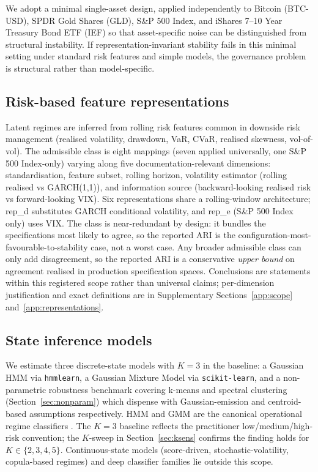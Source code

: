 \documentclass[preprint,12pt,authoryear]{elsarticle}
\newcommand{\BTC}{Bitcoin (BTC-USD)}
\newcommand{\GLD}{SPDR Gold Shares (GLD)}
\newcommand{\SPX}{S\&P 500 Index}
\newcommand{\IEF}{iShares 7--10 Year Treasury Bond ETF (IEF)}
\begin{document}
We adopt a minimal single-asset design, applied independently to \BTC{}, \GLD{}, \SPX{}, and \IEF{} so that asset-specific noise can be distinguished from structural instability. If representation-invariant stability fails in this minimal setting under standard risk features and simple models, the governance problem is structural rather than model-specific.

\subsection{Risk-based feature representations}

Latent regimes are inferred from rolling risk features common in downside risk management (realised volatility, drawdown, VaR, CVaR, realised skewness, vol-of-vol). The admissible class is eight mappings (seven applied universally, one \SPX{}-only) varying along five documentation-relevant dimensions: standardisation, feature subset, rolling horizon, volatility estimator (rolling realised vs GARCH(1,1)), and information source (backward-looking realised risk vs forward-looking VIX). Six representations share a rolling-window architecture; rep\_d substitutes GARCH conditional volatility, and rep\_e (\SPX{} only) uses VIX. The class is near-redundant by design: it bundles the specifications most likely to agree, so the reported ARI is the configuration-most-favourable-to-stability case, not a worst case. Any broader admissible class can only add disagreement, so the reported ARI is a conservative \emph{upper bound} on agreement realised in production specification spaces. Conclusions are statements within this registered scope rather than universal claims; per-dimension justification and exact definitions are in Supplementary Sections~\ref{app:scope} and~\ref{app:representations}.

\subsection{State inference models}

We estimate three discrete-state models with $K=3$ in the baseline: a Gaussian HMM \citep{ElliottAggounMoore1995} via \texttt{hmmlearn}, a Gaussian Mixture Model via \texttt{scikit-learn}, and a non-parametric robustness benchmark covering k-means and spectral clustering (Section~\ref{sec:nonparam}) which dispense with Gaussian-emission and centroid-based assumptions respectively. HMM and GMM are the canonical operational regime classifiers \citep{Hamilton1989,AngTimmermann2012,Guidolin2011}. The $K=3$ baseline reflects the practitioner low/medium/high-risk convention; the $K$-sweep in Section~\ref{sec:ksens} confirms the finding holds for $K\in\{2,3,4,5\}$. Continuous-state models (score-driven, stochastic-volatility, copula-based regimes) and deep classifier families lie outside this scope.
\end{document}
